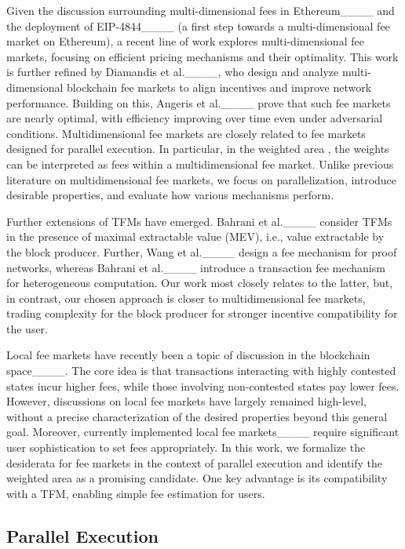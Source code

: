 Given the discussion surrounding multi-dimensional fees in Ethereum____ and the deployment of EIP-4844____ (a first step towards a multi-dimensional fee market on Ethereum), a recent line of work explores multi-dimensional fee markets, focusing on efficient pricing mechanisms and their optimality. This work is further refined by Diamandis et al.____, who design and analyze multi-dimensional blockchain fee markets to align incentives and improve network performance. Building on this, Angeris et al.____ prove that such fee markets are nearly optimal, with efficiency improving over time even under adversarial conditions. Multidimensional fee markets are closely related to fee markets designed for parallel execution. In particular, in the weighted area \GCM, the weights can be interpreted as fees within a multidimensional fee market. Unlike previous literature on multidimensional fee markets, we focus on parallelization, introduce desirable properties, and evaluate how various mechanisms perform.


Further extensions of TFMs have emerged. Bahrani et al.____ consider TFMs in the presence of maximal extractable value (MEV), i.e., value extractable by the block producer. Further, Wang et al.____ design a fee mechanism for proof networks, whereas Bahrani et al.____ introduce a transaction fee mechanism for heterogeneous computation. Our work most closely relates to the latter, but, in contrast, our chosen approach is closer to multidimensional fee markets, trading complexity for the block producer for stronger incentive compatibility for the user.  

Local fee markets have recently been a topic of discussion in the blockchain space____. The core idea is that transactions interacting with highly contested states incur higher fees, while those involving non-contested states pay lower fees. However, discussions on local fee markets have largely remained high-level, without a precise characterization of the desired properties beyond this general goal. Moreover, currently implemented local fee markets____ require significant user sophistication to set fees appropriately. In this work, we formalize the desiderata for fee markets in the context of parallel execution and identify the weighted area \GCM as a promising candidate. One key advantage is its compatibility with a TFM, enabling simple fee estimation for users.


\subsection{Parallel Execution}

